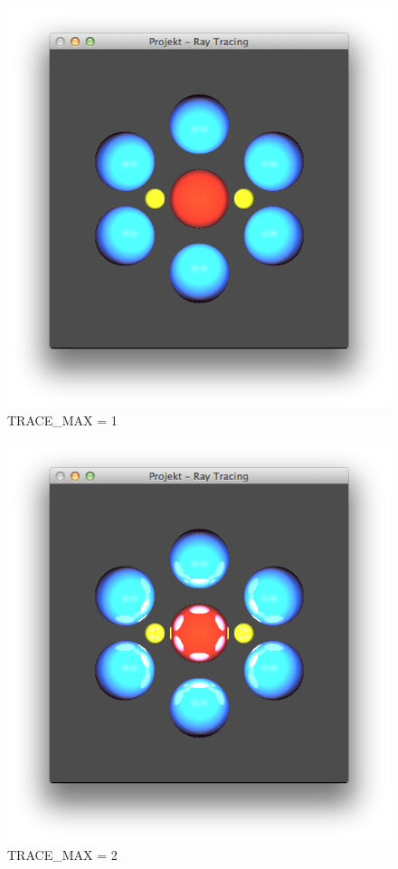 \documentclass[wide,a4paper,titlepage,12pt] {article}
\begin{document}
  \begin{figure}[h!]
    \begin{center}
      \includegraphics[width=\textwidth]{1.png}
      \caption{TRACE\_MAX = 1}
    \end{center}
  \end{figure}

  \begin{figure}[h!]
    \begin{center}
      \includegraphics[width=\textwidth]{2.png}
      \caption{TRACE\_MAX = 2}
    \end{center}
  \end{figure}
\end{document}
